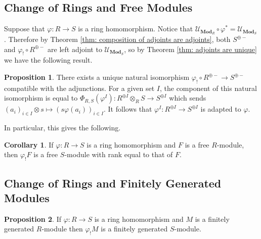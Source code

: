 \documentclass[oneside,11pt]{amsart}
\newcommand{\bMod}{\ensuremath{\textbf{Mod}}}
\newcommand{\mU}{\ensuremath{\mathcal{U}}}
\theoremstyle{definition}
\newtheorem{proof techniques}{Proof Techniques}
\newtheorem{corollary}{Corollary}
\newtheorem{proposition}{Proposition}
\begin{document}

\subsection{Change of Rings and Free Modules} 


Suppose that $\varphi : R \to S$ is a ring homomorphism. Notice that $\mU_{\bMod_R} \circ \varphi^* = \mU_{\bMod_S}$. Therefore by Theorem \ref{thm: composition of adjoints are adjoints}, both $S^{\oplus -}$ and $\varphi_! \circ R^{\oplus -}$ are left adjoint to $\mU_{\bMod_S}$, so by Theorem \ref{thm: adjoints are unique} we have the following result. 

\begin{proposition}\label{prop: isomorphism between direct sum tensor ring extension and free module}
There exists a unique natural isomorphism $\varphi_! \circ R^{\oplus -} \to S^{\oplus -}$ compatible with the adjunctions. For a given set $I$, the component of this natural isomorphism is equal to $\Phi_{R , S}(\varphi^I) : R^{\oplus I} \otimes_R S \to S^{\oplus I}$ which sends $(a_i)_{i \in I} \otimes s \mapsto (s\varphi(a_i))_{i \in I}$. It follows that $\varphi^I : R^{\oplus I} \to S^{\oplus I}$ is adapted to $\varphi$.
\end{proposition}

In particular, this gives the following.

\begin{corollary}\label{cor: extension of scalars preserves free rank}
If $\varphi : R \to S$ is a ring homomorphism and $F$ is a free $R$-module, then $\varphi_! F$ is a free $S$-module with rank equal to that of $F$. 
\end{corollary}



\subsection{Change of Rings and Finitely Generated Modules} 

\begin{proposition}\label{prop: extension of scalars preserves finitely generated}
If $\varphi : R \to S$ is a ring homomorphism and $M$ is a finitely generated $R$-module then $\varphi_! M$ is a finitely generated $S$-module. 
\end{proposition}
\end{document}
